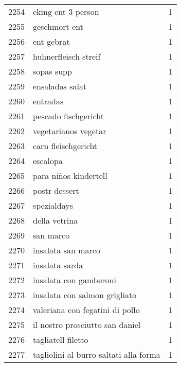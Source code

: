 \begin{tabular}{llr}
2254 &                                 eking ent 3 person &      1 \\
2255 &                                      geschmort ent &      1 \\
2256 &                                         ent gebrat &      1 \\
2257 &                               huhnerfleisch streif &      1 \\
2258 &                                         sopas supp &      1 \\
2259 &                                    ensaladas salat &      1 \\
2260 &                                           entradas &      1 \\
2261 &                               pescado fischgericht &      1 \\
2262 &                               vegetarianos vegetar &      1 \\
2263 &                                carn fleischgericht &      1 \\
2264 &                                           escalopa &      1 \\
2265 &                              para niños kindertell &      1 \\
2266 &                                      postr dessert &      1 \\
2267 &                                        spezialdays &      1 \\
2268 &                                      della vetrina &      1 \\
2269 &                                          san marco &      1 \\
2270 &                                 insalata san marco &      1 \\
2271 &                                     insalata sarda &      1 \\
2272 &                             insalata con gamberoni &      1 \\
2273 &                      insalata con salmon grigliato &      1 \\
2274 &                    valeriana con fegatini di pollo &      1 \\
2275 &                    il nostro prosciutto san daniel &      1 \\
2276 &                                 tagliatell filetto &      1 \\
2277 &             tagliolini al burro saltati alla forma &      1 \\

\end{tabular}
